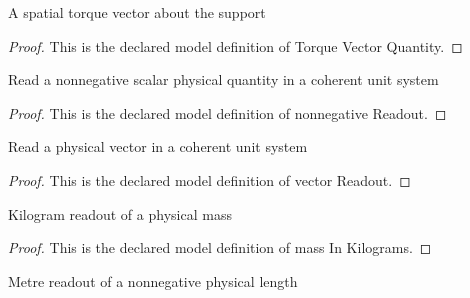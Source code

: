 \begin{definition}
  \label{def:physics:phyx-mini-0702:phyxminiproblems-problemphyxmini0702-torquevectorquantity}
  A spatial torque vector about the support
\end{definition}
\begin{proof}
  This is the declared model definition of Torque Vector Quantity.
\end{proof}
\begin{definition}
  \label{def:physics:phyx-mini-0702:phyxminiproblems-problemphyxmini0702-nonnegativereadout}
  Read a nonnegative scalar physical quantity in a coherent unit system
\end{definition}
\begin{proof}
  This is the declared model definition of nonnegative Readout.
\end{proof}
\begin{definition}
  \label{def:physics:phyx-mini-0702:phyxminiproblems-problemphyxmini0702-vectorreadout}
  Read a physical vector in a coherent unit system
\end{definition}
\begin{proof}
  This is the declared model definition of vector Readout.
\end{proof}
\begin{definition}
  \label{def:physics:phyx-mini-0702:phyxminiproblems-problemphyxmini0702-massinkilograms}
  Kilogram readout of a physical mass
\end{definition}
\begin{proof}
  This is the declared model definition of mass In Kilograms.
\end{proof}
\begin{definition}
  \label{def:physics:phyx-mini-0702:phyxminiproblems-problemphyxmini0702-lengthinmeters}
  Metre readout of a nonnegative physical length
\end{definition}
